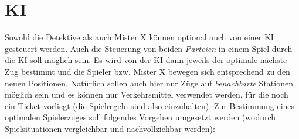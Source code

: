     \section{KI}
        Sowohl die Detektive als auch Mister X können optional auch von einer KI gesteuert werden.
        Auch die Steuerung von beiden \textit{Parteien} in einem Spiel durch die KI soll möglich sein.
        Es wird von der KI dann jeweils der optimale nächste Zug bestimmt und die Spieler bzw. Mister X bewegen sich entsprechend zu den neuen Positionen.
        Natürlich sollen auch hier nur Züge auf \textit{benachbarte} Stationen möglich sein und es können nur Verkehrsmittel verwendet werden, für die noch ein Ticket vorliegt (die Spielregeln sind also einzuhalten). 
        \newline
        \newline
        Zur Bestimmung eines optimalen Spielerzuges soll folgendes Vorgehen umgesetzt werden (wodurch Spielsituationen vergleichbar und nachvollziehbar werden): 
